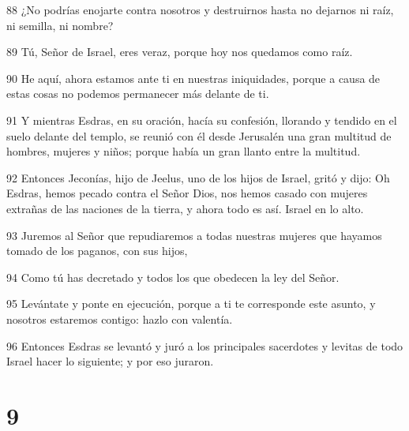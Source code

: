 \par 88 ¿No podrías enojarte contra nosotros y destruirnos hasta no dejarnos ni raíz, ni semilla, ni nombre?
\par 89 Tú, Señor de Israel, eres veraz, porque hoy nos quedamos como raíz.
\par 90 He aquí, ahora estamos ante ti en nuestras iniquidades, porque a causa de estas cosas no podemos permanecer más delante de ti.
\par 91 Y mientras Esdras, en su oración, hacía su confesión, llorando y tendido en el suelo delante del templo, se reunió con él desde Jerusalén una gran multitud de hombres, mujeres y niños; porque había un gran llanto entre la multitud.
\par 92 Entonces Jeconías, hijo de Jeelus, uno de los hijos de Israel, gritó y dijo: Oh Esdras, hemos pecado contra el Señor Dios, nos hemos casado con mujeres extrañas de las naciones de la tierra, y ahora todo es así. Israel en lo alto.
\par 93 Juremos al Señor que repudiaremos a todas nuestras mujeres que hayamos tomado de los paganos, con sus hijos,
\par 94 Como tú has decretado y todos los que obedecen la ley del Señor.
\par 95 Levántate y ponte en ejecución, porque a ti te corresponde este asunto, y nosotros estaremos contigo: hazlo con valentía.
\par 96 Entonces Esdras se levantó y juró a los principales sacerdotes y levitas de todo Israel hacer lo siguiente; y por eso juraron.

\chapter{9}

